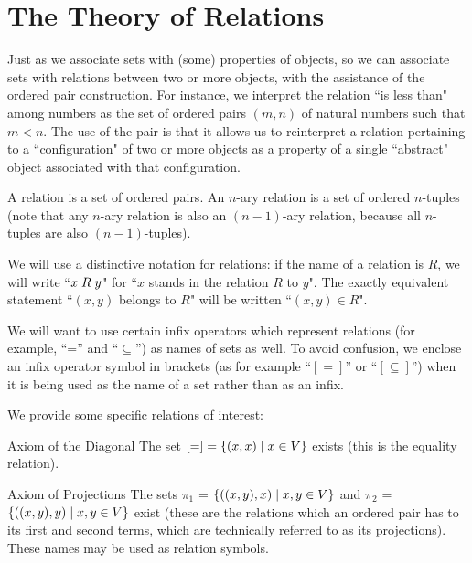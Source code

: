 \chapter[The Theory of Relations]{The Theory of Relations}

Just as we associate sets with (some) properties of objects,
so we can associate sets with relations between two or more objects,
with the assistance of the ordered pair construction.  For
instance, we interpret the relation ``is less than" among numbers as the set of
ordered pairs $(m,n)$ of natural numbers such that $m <
n$.  The use
of the pair is that it allows us to reinterpret a relation pertaining
to a ``configuration" of two or more objects as a property of a single
``abstract" object associated with that configuration.

\begin{definition}
 A {\upshape relation\/} is a
 set of ordered pairs.  An {\upshape $n$-ary 
 relation} is a set of ordered $n$-tuples (note that any $n$-ary relation
 is also an $(n-1)$-ary relation, because all $n$-tuples are also 
 $(n-1)$-tuples).
\end{definition}
 
We will use a distinctive notation for relations: if the name
of a relation is $R$, we will write ``$x \mathrel{R} y$" for ``$x$ stands in
the relation $R$ to $y$".  The exactly equivalent statement ``$(x,y)$
belongs to $R$" will be written ``$(x,y) \in R$".

We will want to use certain infix operators which represent
relations (for example, ``='' and ``$\subseteq$'') as names of sets as
well.  To avoid confusion, we enclose an infix operator symbol in
brackets (as for example ``$[=]$'' or ``$[\subseteq]$'') when it is
being used as the name of a set rather than as an infix.

We provide some specific relations of interest:

\begin{axiom}{Axiom of the Diagonal}
 The set $[=] = \{(x,x) \mid x \in V\}$ exists (this is
 the {\upshape equality relation}).
\end{axiom}

\begin{axiom}{Axiom of Projections}
 The sets $\pi_1$ = $\{((x,y),x) \mid x,y \in V\}$ and $\pi_2$ =
 $\{((x,y),y) \mid x,y \in V\}$ exist (these are the relations which an ordered
 pair has to its first and second terms, which are
 technically referred to as its {\upshape projections}).  These names may be
 used as relation symbols.
\end{axiom}

